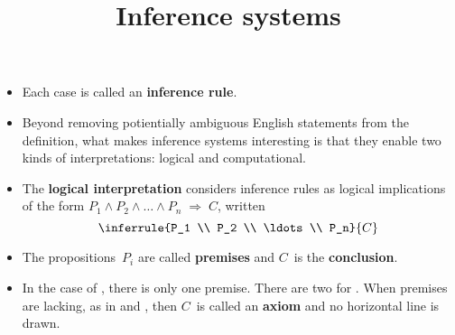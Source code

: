 \documentclass[wide]{slides}
\begin{document}
\begin{slide}
  \title{Inference systems}

  \begin{itemize}

    \item Each case is called an \textbf{inference rule}.

    \item Beyond removing potientially ambiguous English statements
      from the definition, what makes inference systems interesting is
      that they enable two kinds of interpretations: logical and
      computational.

    \item The \textbf{logical interpretation} considers inference
      rules as logical implications of the form \(P_1 \wedge P_2
      \wedge \ldots \wedge P_n \;\Rightarrow\; C\), written
      \begin{equation*}
        \inferrule
            {P_1 \\ P_2 \\ \ldots \\ P_n}
            {C}
      \end{equation*}

    \item The propositions~\(P_i\) are called \textbf{premises} and
      \(C\)~is the \textbf{conclusion}.

    \item In the case of , there is only one
      premise. There are two for . When premises are
      lacking, as in  and , then \(C\)~is
      called an \textbf{axiom} and no horizontal line is drawn.

  \end{itemize}

\end{slide}
\end{document}
